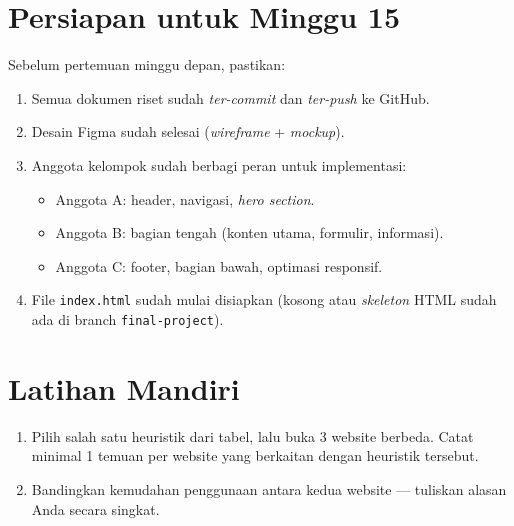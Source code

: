 \section{Persiapan untuk Minggu 15}
\label{sec:persiapan-minggu-15}

Sebelum pertemuan minggu depan, pastikan:
\begin{enumerate}
  \item Semua dokumen riset sudah \emph{ter-commit} dan \emph{ter-push} ke GitHub.
  \item Desain Figma sudah selesai (\emph{wireframe} + \emph{mockup}).
  \item Anggota kelompok sudah berbagi peran untuk implementasi:
  \begin{itemize}
    \item Anggota A: header, navigasi, \emph{hero section}.
    \item Anggota B: bagian tengah (konten utama, formulir, informasi).
    \item Anggota C: footer, bagian bawah, optimasi responsif.
  \end{itemize}
  \item File \texttt{index.html} sudah mulai disiapkan (kosong atau \emph{skeleton} HTML sudah ada di branch \texttt{final-project}).
\end{enumerate}

\section{Latihan Mandiri}
\label{sec:latihan-minggu-14}

\begin{latihan}
\begin{enumerate}[label=\alph*., leftmargin=2em, itemsep=2pt]
  \item Pilih salah satu heuristik dari tabel, lalu buka 3 website berbeda. Catat minimal 1 temuan per website yang berkaitan dengan heuristik tersebut.
  \item Bandingkan kemudahan penggunaan antara kedua website --- tuliskan alasan Anda secara singkat.
\end{enumerate}
\end{latihan}
